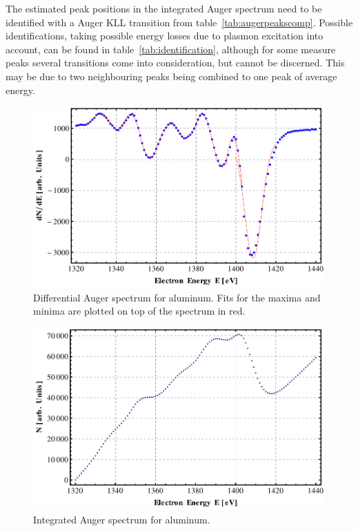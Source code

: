 \documentclass[a4paper,10pt]{scrartcl}
\begin{document}
The estimated peak positions in the integrated Auger spectrum need to be identified with a Auger KLL transition from table~\ref{tab:augerpeakscomp}. Possible identifications, taking possible energy losses due to plasmon excitation into account, can be found in table~\ref{tab:identification}, although for some measure peaks several transitions come into consideration, but cannot be discerned. This may be due to two neighbouring peaks being combined to one peak of average energy.

\begin{figure}
\centering
\includegraphics[scale=0.6]{img/augerpeaks}
\caption{Differential Auger spectrum for aluminum. Fits for the maxima and minima are plotted on top of the spectrum in red. \label{fig:augerpeaks}}
\end{figure}

\begin{figure}
\centering
\includegraphics[scale=0.6]{img/intaugerpeaks}
\caption{Integrated Auger spectrum for aluminum. \label{fig:intaugerpeaks}}
\end{figure}
\end{document}
